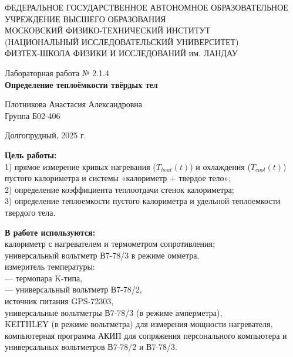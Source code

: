 \documentclass[a4paper,12pt]{article} %
\begin{document}
\begin{center}
	\footnotesize{ФЕДЕРАЛЬНОЕ ГОСУДАРСТВЕННОЕ АВТОНОМНОЕ ОБРАЗОВАТЕЛЬНОЕ 			УЧРЕЖДЕНИЕ ВЫСШЕГО ОБРАЗОВАНИЯ}\\
	\footnotesize{МОСКОВСКИЙ ФИЗИКО-ТЕХНИЧЕСКИЙ ИНСТИТУТ\\(НАЦИОНАЛЬНЫЙ 			ИССЛЕДОВАТЕЛЬСКИЙ УНИВЕРСИТЕТ)}\\
	\footnotesize{ФИЗТЕХ-ШКОЛА ФИЗИКИ И ИССЛЕДОВАНИЙ им. ЛАНДАУ\\}
	\hfill \break
	\hfill \break
	\hfill \break
	\hfill \break
\end{center}

\begin{center}   
    \hfill \break
	\hfill \break
	\hfill \break
	\hfill \break    \hfill \break
	\hfill \break
	\hfill \break
	\hfill \break
    \hfill \break
    \hfill \break
	\hfill \break
	\large{Лабораторная работа № 2.1.4\\\textbf{Определение теплоёмкости твёрдых тел}}\\
	\begin{flushright}
		Плотникова Анастасия Александровна\\
		Группа Б02-406
	\end{flushright}
	\hfill \break
	\hfill \break
	\hfill \break
\end{center}
\hfill \break
\hfill \break
\hfill \break
\hfill \break
\hfill \break
\hfill \break
\hfill \break
\hfill \break
\hfill \break
\hfill \break
\hfill \break
\hfill \break
\hfill \break
\begin{center}
	Долгопрудный, 2025 г.
\end{center}
\thispagestyle{empty}
\newpage
	\textbf{Цель работы:}\\ 
  1) прямое измерение кривых нагревания ($T_{heat}(t)$) и охлаждения ($T_{cool}(t)$) пустого калориметра и системы «калориметр + твердое тело»; \\
  2) определение коэффициента теплоотдачи стенок калориметра; \\
  3) определение теплоемкости пустого калориметра и удельной теплоемкости твердого тела.
	\hfill \break
	
	\textbf{В работе используются:}\\ 
  калориметр с нагревателем и термометром сопротивления; \\
  универсальный вольтметр В7-78/3 в режиме омметра, \\
  измеритель температуры: \\
  — термопара K-типа, \\
  — универсальный вольтметр В7-78/2, \\
  источник питания GPS-72303, \\
  универсальные вольтметры В7-78/3 (в режиме амперметра), \\
  KEITHLEY (в режиме вольтметра) для измерения мощности нагревателя, \\
  компьютерная программа АКИП для сопряжения персонального компьютера и универсальных вольтметров В7-78/2 и В7-78/3.
	
\end{document}
